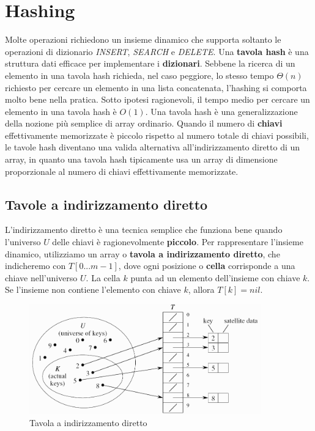 \section{Hashing}

Molte operazioni richiedono un insieme dinamico che supporta soltanto le operazioni di dizionario \textit{INSERT}, \textit{SEARCH} e \textit{DELETE}. Una \textbf{tavola hash} è una struttura dati efficace per implementare i \textbf{dizionari}. Sebbene la ricerca di un elemento in una tavola hash richieda, nel caso peggiore, lo stesso tempo $\Theta(n)$ richiesto per cercare un elemento in una lista concatenata, l'hashing si comporta molto bene nella pratica. Sotto ipotesi ragionevoli, il tempo medio per cercare un elemento in una tavola hash è $O(1)$.
Una tavola hash è una generalizzazione della nozione più semplice di array ordinario. Quando il numero di \textbf{chiavi} effettivamente memorizzate è piccolo rispetto al numero totale di chiavi possibili, le tavole hash diventano una valida alternativa all'indirizzamento diretto di un array, in quanto una tavola hash tipicamente usa un array di dimensione proporzionale al numero di chiavi effettivamente memorizzate.

\subsection{Tavole a indirizzamento diretto}

L'indirizzamento diretto è una tecnica semplice che funziona bene quando l'universo $U$ delle chiavi è ragionevolmente \textbf{piccolo}. 
Per rappresentare l'insieme dinamico, utilizziamo un array o \textbf{tavola a indirizzamento diretto}, che indicheremo con $T[0...m-1]$, dove ogni posizione o \textbf{cella} corrisponde a una chiave nell'universo $U$. La cella $k$ punta ad un elemento dell'insieme con chiave $k$. Se l'insieme non contiene l'elemento con chiave $k$, allora $T[k]=nil$.

\begin{figure}[htpd]
\centering
\includegraphics[width=100mm]{images/direct-hash.png}
\caption{Tavola a indirizzamento diretto}
\end{figure}

